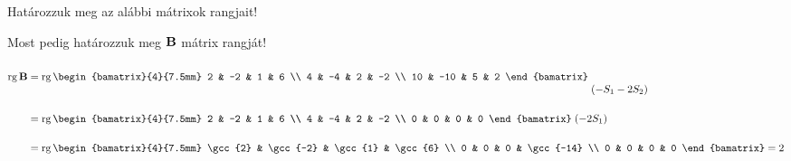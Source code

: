 \documentclass[exercise]{math-standalone}
\begin{document}
\begin{exercise}{Határozzuk meg az alábbi mátrixok rangjait!}
{    \tcbline

    Most pedig határozzuk meg $\mathbf{B}$ mátrix rangját!
    \begin{align*}
      \rg \rmat B
       & = \rg
      \begin{bamatrix}{4}{7.5mm}
        2  & -2  & 1 & 6  \\
        4  & -4  & 2 & -2 \\
        10 & -10 & 5 & 2
      \end{bamatrix}
      \;
      \begin{matrix}
        \\\\(-S_1 - 2S_2)
      \end{matrix}
      \\
       & = \rg
      \begin{bamatrix}{4}{7.5mm}
        2  & -2  & 1 & 6  \\
        4  & -4  & 2 & -2 \\
        0 & 0 & 0 & 0
      \end{bamatrix}
      \;
      \begin{matrix}
        \\(-2S_1)\\\,
      \end{matrix}
      \\
       & = \rg
      \begin{bamatrix}{4}{7.5mm}
        \gcc{2} & \gcc{-2} & \gcc{1} & \gcc{6}   \\
        0       & 0        & 0       & \gcc{-14} \\
        0       & 0        & 0       & 0
      \end{bamatrix}
      =2
    \end{align*}
  }
\end{exercise}
\end{document}
